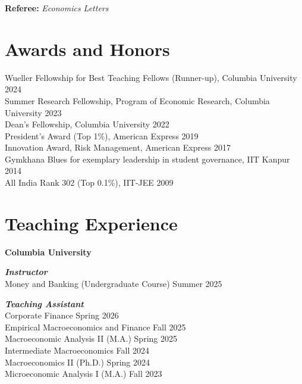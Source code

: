 \documentclass[11pt]{article}
\begin{document}
\textbf{Referee:} \textit{Economics Letters}

\section*{Awards and Honors}

Wueller Fellowship for Best Teaching Fellows (Runner-up), Columbia University \hfill 2024 \\
Summer Research Fellowship, Program of Economic Research, Columbia University \hfill 2023 \\
Dean’s Fellowship, Columbia University \hfill 2022 \\
President’s Award (Top 1\%), American Express \hfill 2019 \\
Innovation Award, Risk Management, American Express \hfill 2017 \\
Gymkhana Blues for exemplary leadership in student governance, IIT Kanpur \hfill 2014 \\
All India Rank 302 (Top 0.1\%), IIT-JEE \hfill 2009

\section*{Teaching Experience}

\textbf{Columbia University}

\textbf{\textit{Instructor}} \\
Money and Banking (Undergraduate Course) \hfill Summer 2025

\textbf{\textit{Teaching Assistant}} \\
Corporate Finance \hfill Spring 2026 \\
Empirical Macroeconomics and Finance \hfill Fall 2025 \\
Macroeconomic Analysis II (M.A.) \hfill Spring 2025 \\
Intermediate Macroeconomics \hfill Fall 2024 \\
Macroeconomics II (Ph.D.) \hfill Spring 2024 \\
Microeconomic Analysis I (M.A.) \hfill Fall 2023


\end{document}
